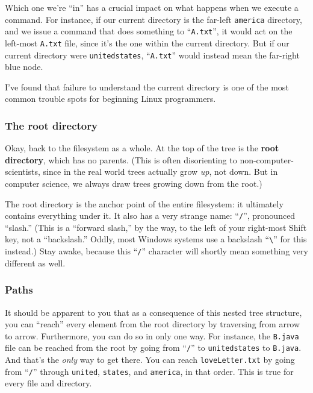 Which one we're ``in'' has a crucial impact on what happens when we execute a
command. For instance, if our current directory is the far-left
\texttt{america} directory, and we issue a command that does something to
``\texttt{A.txt}'', it would act on the left-most \texttt{A.txt} file, since
it's the one within the current directory. But if our current directory were
\texttt{unitedstates}, ``\texttt{A.txt}'' would instead mean the far-right blue
node.

I've found that failure to understand the current directory is one of the most
common trouble spots for beginning Linux programmers.

\subsubsection{The root directory}

Okay, back to the filesystem as a whole. At the top of the tree is the
\textbf{root directory}, which has no parents. (This is often disorienting to
non-computer-scientists, since in the real world trees actually grow
\textit{up}, not down. But in computer science, we always draw trees growing
down from the root.)

The root directory is the anchor point of the entire filesystem: it ultimately
contains everything under it. It also has a very strange name: ``\texttt{/}'',
pronounced ``slash.'' (This is a ``forward slash,'' by the way, to the left of
your right-most Shift key, not a ``backslash.'' Oddly, most Windows systems
use a backslash ``\texttt{\textbackslash}'' for this instead.) Stay awake,
because this ``\texttt{/}'' character will shortly mean something very
different as well.

\subsubsection{Paths}

It should be apparent to you that as a consequence of this nested tree
structure, you can ``reach'' every element from the root directory by
traversing from arrow to arrow. Furthermore, you can do so in only one way.
For instance, the \texttt{B.java} file can be reached from the root by going
from ``\texttt{/}'' to \texttt{unitedstates} to \texttt{B.java}. And that's the
\textit{only} way to get there. You can reach \texttt{loveLetter.txt} by going
from ``\texttt{/}'' through \texttt{united}, \texttt{states}, and
\texttt{america}, in that order. This is true for every file and directory.

